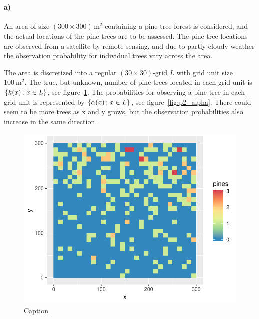 \section{}
\label{sec:problem2}

\paragraph{a)}
An area of size $(300 \times 300) \, \si{\meter^2}$ containing a pine tree forest is considered, and the actual locations of the pine trees are to be assessed. The pine tree locations are observed from a satellite by remote sensing, and due to partly cloudy weather the observation probability for individual trees vary across the area.

The area is discretized into a regular $(30 \times 30)$-grid $L$ with grid unit size $\SI{100}{\meter^2}$. The true, but unknown, number of pine trees located in each grid unit is $\{k(x) \,;\, x \in L\}$, see figure~\ref{fig:p2_pines}. The probabilities for observing a pine tree in each grid unit is represented by $\{\alpha(x) \,;\, x \in L\}$, see figure~\ref{fig:p2_alpha}. There could seem to be more trees as x and y grows, but the observation probabilities also increase in the same direction.

\begin{figure}
    \centering
    \includegraphics{figures/p2_pines.pdf}
    \caption{Caption}
    \label{fig:p2_pines}
\end{figure}

